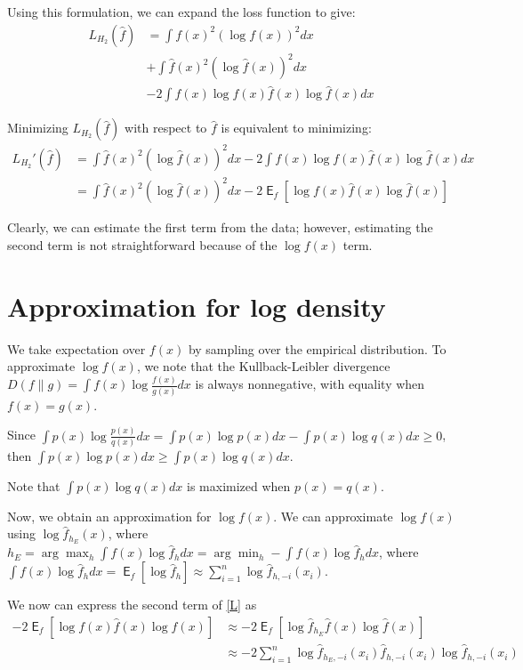 \documentclass{article}
\DeclareMathOperator*{\E}{\mathsf{E}}
\begin{document}
  Using this formulation, we can expand the loss function to give:
  \begin{align*}
    L_{H_2}(\hat{f})& = \int f(x)^2 (\log f(x))^2 dx\\
    & + \int \hat{f}(x)^2 (\log \hat{f}(x))^2 dx\\
    & - 2 \int f(x) \log f(x) \hat{f}(x) \log \hat{f}(x) dx
  \end{align*}




  Minimizing $ L_{H_2}(\hat{f}) $ with respect to $ \hat{f} $ is equivalent to minimizing:
  \begin{align} \label{L}
    L_{H_2}'(\hat{f}) &= \int \hat{f}(x)^2 (\log \hat{f}(x))^2 dx  - 2 \int f(x) \log f(x) \hat{f}(x) \log \hat{f}(x) dx \nonumber\\ 
    & =\int \hat{f}(x)^2 (\log \hat{f}(x))^2 dx  - 2 \E_f[\log f(x) \hat{f}(x) \log \hat{f}(x)]
  \end{align}


  Clearly, we can estimate the first term from the data; however, estimating the second term is not straightforward because of the $ \log f(x) $ term. 

  \section{Approximation for log density}

  We take expectation over $ f(x) $ by sampling over the empirical distribution. To approximate $\log f(x)$, we note that the Kullback-Leibler divergence $ D(f\|g) = \int f(x) \log \frac{f(x)}{g(x)} dx $ is always nonnegative, with equality when $ f(x) = g(x) $.

  Since $ \int p(x) \log \frac{p(x)}{q(x)} dx = \int p(x) \log p(x) dx - \int p(x) \log q(x) dx \geq 0 $, then $ \int p(x) \log p(x) dx \geq \int p(x) \log q(x) dx $.

  Note that $ \int p(x) \log q(x) dx $ is maximized when $ p(x) = q(x) $.

  Now, we obtain an approximation for $ \log f(x) $. We can approximate $ \log f(x) $ using $ \log \hat{f}_{h_E}(x) $, where $ h_E = \arg \max_h \int f(x) \log \hat{f}_h dx = \arg \min_h - \int f(x) \log \hat{f}_h dx $, where $ \int f(x) \log \hat{f}_h dx = \E_f[\log \hat{f}_h] \approx \sum_{i=1}^n \log \hat{f}_{h,-i}(x_i) $.

  We now can express the second term of \eqref{L} as
  \begin{align*}
    -2 \E_{f}[\log f(x) \hat{f}(x) \log \hat{f}(x)] & \approx -2 \E_f[ \log \hat{f}_{h_E} \hat{f}(x) \log \hat{f}(x)]\\
    & \approx -2 \sum_{i=1}^n \log \hat{f}_{h_E,-i}(x_i) \hat{f}_{h,-i}(x_i) \log \hat{f}_{h,-i}(x_i)
  \end{align*}
\end{document}
